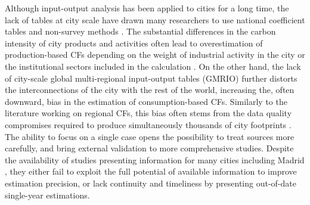 \documentclass[
  10pt,
  twocolumn]{aft}
\begin{document}
Although input-output analysis has been applied to cities for a long
time, the lack of tables at city scale have drawn many researchers to
use national coefficient tables and non-survey methods
\citep{wiedmann_concept_2016, fry_assessing_2018, wiedmann_city_2021, moran_carbon_2018}.
The substantial differences in the carbon intensity of city products and
activities often lead to overestimation of production-based CFs
depending on the weight of industrial activity in the city or the
institutional sectors included in the calculation
\citep{fry_assessing_2018}. On the other hand, the lack of city-scale
global multi-regional input-output tables (GMRIO) further distorts the
interconnections of the city with the rest of the world, increasing the,
often downward, bias in the estimation of consumption-based CFs.
Similarly to the literature working on regional CFs, this bias often
stems from the data quality compromises required to produce
simultaneously thousands of city footprints
\citep{moran_carbon_2018, caro_mapping_2017, eea_environmental_2013, ivanova_mapping_2017}.
The ability to focus on a single case opens the possibility to treat
sources more carefully, and bring external validation to more
comprehensive studies. Despite the availability of studies presenting
information for many cities including Madrid
\citep{andradeImplementingCitylevelCarbon2018, c40_consumption-based_2018, wiedmann_threescope_2021},
they either fail to exploit the full potential of available information
to improve estimation precision, or lack continuity and timeliness by
presenting out-of-date single-year estimations.
\end{document}
